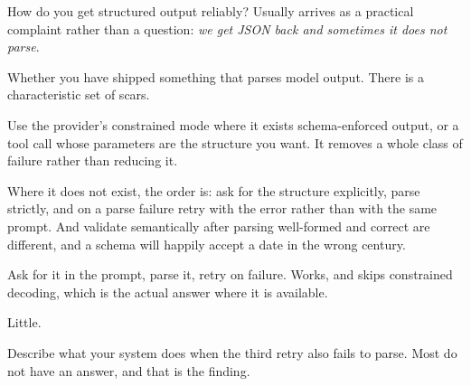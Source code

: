 \begin{bankq}{How do you get structured output reliably?}
\qasked
Usually arrives as a practical complaint rather than a question: \emph{we get
JSON back and sometimes it does not parse}.

\qtested
Whether you have shipped something that parses model output. There is a
characteristic set of scars.

\qstaff
Use the provider's constrained mode where it exists \dash{} schema-enforced
output, or a tool call whose parameters are the structure you want. It removes
a whole class of failure rather than reducing it.

Where it does not exist, the order is: ask for the structure explicitly, parse
strictly, and on a parse failure retry with the error rather than with the same
prompt. And validate semantically after parsing \dash{} well-formed and correct
are different, and a schema will happily accept a date in the wrong century.


\qsenior
Ask for it in the prompt, parse it, retry on failure. Works, and skips
constrained decoding, which is the actual answer where it is available.

\qcontested
Little.

\qdrill
Describe what your system does when the third retry also fails to parse. Most
do not have an answer, and that is the finding.
\end{bankq}

